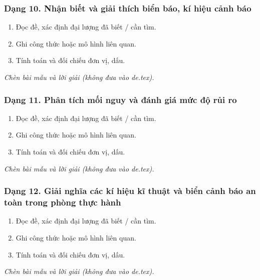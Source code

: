 \subsubsection{Dạng 10. Nhận biết và giải thích biển báo, kí hiệu cảnh báo}
\begin{phuongphap}
\begin{enumerate}
\item Đọc đề, xác định đại lượng đã biết / cần tìm.
\item Ghi công thức hoặc mô hình liên quan.
\item Tính toán và đối chiếu đơn vị, dấu.
\end{enumerate}
\end{phuongphap}
\begin{vidumau}
\textit{Chèn bài mẫu và lời giải (không đưa vào de.tex).}
\end{vidumau}

\subsubsection{Dạng 11. Phân tích mối nguy và đánh giá mức độ rủi ro}
\begin{phuongphap}
\begin{enumerate}
\item Đọc đề, xác định đại lượng đã biết / cần tìm.
\item Ghi công thức hoặc mô hình liên quan.
\item Tính toán và đối chiếu đơn vị, dấu.
\end{enumerate}
\end{phuongphap}
\begin{vidumau}
\textit{Chèn bài mẫu và lời giải (không đưa vào de.tex).}
\end{vidumau}

\subsubsection{Dạng 12. Giải nghĩa các kí hiệu kĩ thuật và biển cảnh báo an toàn trong phòng thực hành}
\begin{phuongphap}
\begin{enumerate}
\item Đọc đề, xác định đại lượng đã biết / cần tìm.
\item Ghi công thức hoặc mô hình liên quan.
\item Tính toán và đối chiếu đơn vị, dấu.
\end{enumerate}
\end{phuongphap}
\begin{vidumau}
\textit{Chèn bài mẫu và lời giải (không đưa vào de.tex).}
\end{vidumau}

